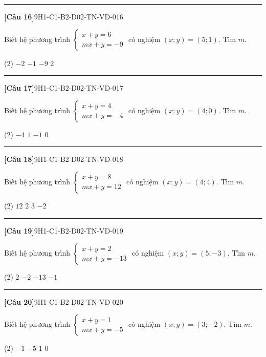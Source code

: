 \documentclass[12pt,a4paper]{article}
\newif\ifloigiai
\newenvironment{cauhoi}[2]{%
  \par\medskip\noindent\rule{\textwidth}{0.4pt}\par\nopagebreak
  \noindent\textbf{[#1]}\hfill{\scriptsize\ttfamily #2}\par\nopagebreak\smallskip}{\par}
\newcommand{\dapan}[1]{\ifloigiai\par\smallskip\noindent\textit{Đáp án:} \textbf{#1}\par\fi}
\begin{document}
\begin{cauhoi}{Câu 16}{9H1-C1-B2-D02-TN-VD-016}
Biết hệ phương trình $\begin{cases}x+y=6\\ mx+y=-9\end{cases}$ có nghiệm $(x;y)=(5;1)$. Tìm $m$.
\begin{tasks}(2)
\task $-2$
\task $-1$
\task $-9$
\task $2$
\end{tasks}
\dapan{A}
\end{cauhoi}
\begin{cauhoi}{Câu 17}{9H1-C1-B2-D02-TN-VD-017}
Biết hệ phương trình $\begin{cases}x+y=4\\ mx+y=-4\end{cases}$ có nghiệm $(x;y)=(4;0)$. Tìm $m$.
\begin{tasks}(2)
\task $-4$
\task $1$
\task $-1$
\task $0$
\end{tasks}
\dapan{C}
\end{cauhoi}
\begin{cauhoi}{Câu 18}{9H1-C1-B2-D02-TN-VD-018}
Biết hệ phương trình $\begin{cases}x+y=8\\ mx+y=12\end{cases}$ có nghiệm $(x;y)=(4;4)$. Tìm $m$.
\begin{tasks}(2)
\task $12$
\task $2$
\task $3$
\task $-2$
\end{tasks}
\dapan{B}
\end{cauhoi}
\begin{cauhoi}{Câu 19}{9H1-C1-B2-D02-TN-VD-019}
Biết hệ phương trình $\begin{cases}x+y=2\\ mx+y=-13\end{cases}$ có nghiệm $(x;y)=(5;-3)$. Tìm $m$.
\begin{tasks}(2)
\task $2$
\task $-2$
\task $-13$
\task $-1$
\end{tasks}
\dapan{B}
\end{cauhoi}
\begin{cauhoi}{Câu 20}{9H1-C1-B2-D02-TN-VD-020}
Biết hệ phương trình $\begin{cases}x+y=1\\ mx+y=-5\end{cases}$ có nghiệm $(x;y)=(3;-2)$. Tìm $m$.
\begin{tasks}(2)
\task $-1$
\task $-5$
\task $1$
\task $0$
\end{tasks}
\dapan{A}
\end{cauhoi}
\end{document}
